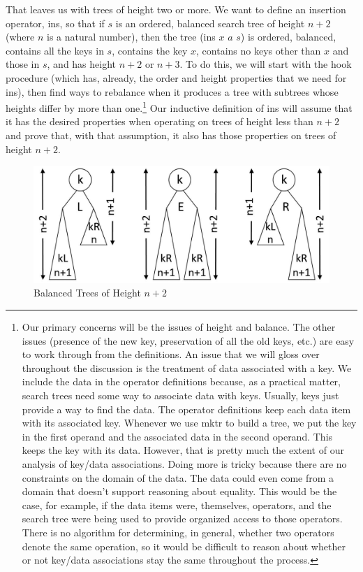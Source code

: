 That leaves us with trees of height two or more.
We want to define an insertion operator, \textsf{ins},
so that
if $s$ is an ordered, balanced search tree
of height $n+2$ (where $n$ is a natural number),
then the tree \textsf{(ins $x$ $a$ $s$)}
is ordered, balanced, contains all the keys in $s$,
contains the key $x$,
contains no keys other than $x$ and those in $s$,
and has height $n+2$ or $n+3$.
To do this,
we will start with the \textsf{hook} procedure
(which has, already, the order and height properties
that we need for \textsf{ins}),
then find ways to rebalance when it produces
a tree with subtrees whose heights differ by more than one.\footnote{Our
primary concerns will be the issues of height and balance.
The other issues
(presence of the new key, preservation of all the old keys,
etc.)
are easy to work through from the definitions.
An issue that we will gloss over throughout the discussion
is the treatment of data associated with a key.
We include the data in the operator definitions because,
as a practical matter, search trees need some way to
associate data with keys.
Usually, keys just provide a way to find the data.
The operator definitions keep each data item
with its associated key.
Whenever we use \textsf{mktr} to build a tree,
we put the key in the first operand
and the associated data in the second operand.
This keeps the key with its data.
However, that is pretty much the extent of
our analysis of key/data associations.
Doing more is tricky because there are no
constraints on the domain of the data.
The data could even come from a domain
that doesn't support reasoning about equality.
This would be the case, for example, if the data items
were, themselves, operators, and the search tree
were being used to provide organized access to those
operators. There is no algorithm
for determining, in general, whether two operators
denote the same operation,
so it would be difficult to reason about whether or
not key/data associations stay the same throughout the process.}
Our inductive definition of \textsf{ins} will
assume that it has the desired properties
when operating on trees of height less than $n+2$
and prove that, with that assumption, it also
has those properties on trees of height $n+2$.

\begin{figure}
\begin{center}
\includegraphics[scale=1]{images-cmyk/ht2-or-more}
\end{center}
\caption{Balanced Trees of Height $n+2$}
\label{fig:trees-of-ht-n+2}
\end{figure}

